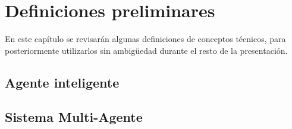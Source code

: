 
\chapter{Definiciones preliminares} 
\label{chap:definiciones_preliminares}

En este capítulo se revisarán algunas definiciones de conceptos
técnicos, para posteriormente utilizarlos sin ambigüedad durante el
resto de la presentación.

\section{Agente inteligente}
 \label{sec:agente_inteligente}
 
 
 

\section{Sistema Multi-Agente}
 \label{sec:sistema_multiagente}
 
 
